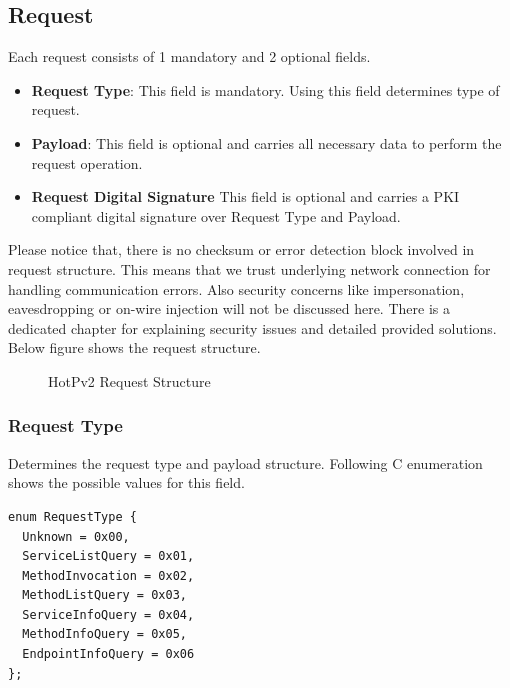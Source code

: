 \documentclass[10pt,a4paper]{article}
\begin{document}
\subsection{Request}
Each request consists of 1 mandatory and 2 optional fields.
\begin{itemize}
  \item \textbf{Request Type}: This field is mandatory. Using this field determines type of request.
  \item \textbf{Payload}: This field is optional and carries all necessary data to perform the request operation.
  \item \textbf{Request Digital Signature} This field is optional and carries a PKI compliant digital signature over Request Type and Payload.
\end{itemize} 
Please notice that, there is no checksum or error detection block involved in request structure. This means that we trust underlying network connection for handling communication errors. Also security concerns like impersonation, eavesdropping or on-wire injection will not be discussed here. There is a dedicated chapter for explaining security issues and detailed provided solutions. Below figure shows the request structure.

\begin{figure}[!ht]
  \caption{HotPv2 Request Structure}
  \centering
\end{figure}

\subsubsection{Request Type}
Determines the request type and payload structure. Following C enumeration shows the possible values for this field.

\begin{verbatim}
enum RequestType { 
  Unknown = 0x00, 
  ServiceListQuery = 0x01, 
  MethodInvocation = 0x02,
  MethodListQuery = 0x03,
  ServiceInfoQuery = 0x04,
  MethodInfoQuery = 0x05,
  EndpointInfoQuery = 0x06
};
\end{verbatim}
\end{document}
